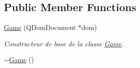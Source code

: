 \subsection*{Public Member Functions}
\begin{DoxyCompactItemize}
\item 
\hyperlink{class_game_a07651e12402cbf4ffb116870594cb347}{Game} (Q\+Dom\+Document $\ast$dom)
\begin{DoxyCompactList}\small\item\em Constructeur de base de la classe \hyperlink{class_game}{Game}. \end{DoxyCompactList}\item 
\hypertarget{class_game_ae3d112ca6e0e55150d2fdbc704474530}{}\hyperlink{class_game_ae3d112ca6e0e55150d2fdbc704474530}{$\sim$\+Game} ()\label{class_game_ae3d112ca6e0e55150d2fdbc704474530}


\end{DoxyCompactItemize}
